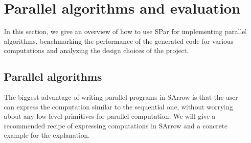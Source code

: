 \chapter{Parallel algorithms and evaluation} \label{eval} \label{chap:eval}
In this section, we give an overview of how to use SPar for implementing parallel algorithms, benchmarking the performance of the generated code for various computations and analyzing the design choices of the project.
\section{Parallel algorithms} \label{eval:sec:palgo}
The biggest advantage of writing parallel programs in SArrow is that the user can express the computation similar to the sequential one, without worrying about any low-level primitives for parallel computation. We will give a recommended recipe of expressing computations in SArrow and a concrete example for the explanation.

